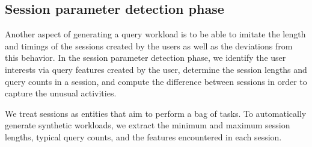 


\subsection{Session parameter detection phase}

Another aspect of generating a query workload is to be able to imitate the length and timings of the sessions created by the users as well as the deviations from this behavior. In the session parameter detection phase, we identify the user interests via query features created by the user, determine the session lengths and query counts in a session, and compute the difference between sessions in order to capture the unusual activities.

We treat sessions as entities that aim to perform a bag of tasks.
To automatically generate synthetic workloads, we extract the minimum and maximum session lengths, typical query counts, and the features encountered in each session.



